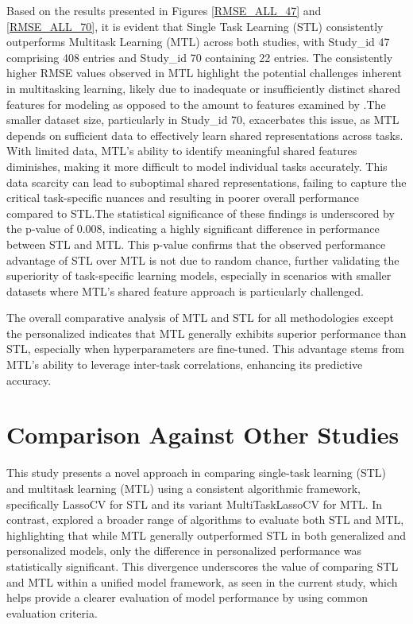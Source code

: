 Based on the results presented in Figures \ref{RMSE_ALL_47} and \ref{RMSE_ALL_70}, it is evident that Single Task Learning (STL) consistently outperforms Multitask Learning (MTL) across both studies, with Study\_id 47 comprising 408 entries and Study\_id 70 containing 22 entries. The consistently higher RMSE values observed in MTL highlight the potential challenges inherent in multitasking learning, likely due to inadequate or insufficiently distinct shared features for modeling as opposed to the amount to features examined by \citet{tseng2020using}.The smaller dataset size, particularly in Study\_id 70, exacerbates this issue, as MTL depends on sufficient data to effectively learn shared representations across tasks. With limited data, MTL's ability to identify meaningful shared features diminishes, making it more difficult to model individual tasks accurately. This data scarcity can lead to suboptimal shared representations, failing to capture the critical task-specific nuances and resulting in poorer overall performance compared to STL.The statistical significance of these findings is underscored by the p-value of 0.008, indicating a highly significant difference in performance between STL and MTL. This p-value confirms that the observed performance advantage of STL over MTL is not due to random chance, further validating the superiority of task-specific learning models, especially in scenarios with smaller datasets where MTL's shared feature approach is particularly challenged. 

The overall comparative analysis of MTL and STL for all methodologies except the personalized indicates that MTL generally exhibits superior performance than STL, especially when hyperparameters are fine-tuned. This advantage stems from MTL’s ability to leverage inter-task correlations, enhancing its predictive accuracy.




\section{Comparison Against Other Studies}
This study presents a novel approach in comparing single-task learning (STL) and multitask learning (MTL) using a consistent algorithmic framework, specifically LassoCV for STL and its variant MultiTaskLassoCV for MTL. In contrast, \citet{tseng2020using} explored a broader range of algorithms to evaluate both STL and MTL, highlighting that while MTL generally outperformed STL in both generalized and personalized models, only the difference in personalized performance was statistically significant. This divergence underscores the value of comparing STL and MTL within a unified model framework, as seen in the current study, which helps provide a clearer evaluation of model performance by using common evaluation criteria.

